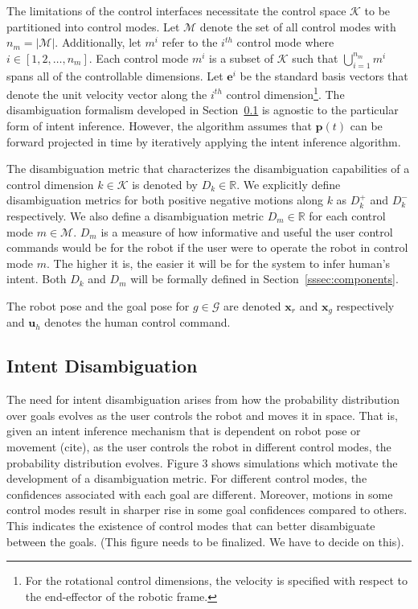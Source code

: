The limitations of the control interfaces necessitate the control space $\mathcal{K}$ to be partitioned into control modes. Let $\mathcal{M}$ denote the set of all control modes with $n_m = \vert\mathcal{M}\vert$. Additionally, let $m^i$ refer to the $i^{th}$ control mode where $i \in [1,2,\dots,n_m]$. Each control mode $m^i$ is a subset of $\mathcal{K}$ such that $\bigcup\limits_{i=1}^{n_m} m^i$ spans all of the controllable dimensions. Let $\boldsymbol{e}^i$ be the standard basis vectors that denote the unit velocity vector along the $i^{th}$ control dimension\footnote{For the rotational control dimensions, the velocity is specified with respect to the end-effector of the robotic frame.}. The disambiguation formalism developed in Section~\ref{ssec:disamb} is agnostic to the particular form of intent inference. However, the algorithm assumes that $\boldsymbol{p}(t)$ can be forward projected in time by iteratively applying the intent inference algorithm. 

The disambiguation metric that characterizes the disambiguation capabilities of a control dimension $k \in \mathcal{K}$ is denoted by $D_k \in \mathbb{R}$. We explicitly define disambiguation metrics for both positive negative motions along $k$ as $D_k^{+}$ and $D_k^{-}$ respectively. We also define a disambiguation metric $D_m \in \mathbb{R}$ for each control mode $m \in \mathcal{M}$. $D_m$ is a measure of how informative and useful the user control commands would be for the robot if the user were to operate the robot in control mode $m$. The higher it is, the easier it will be for the system to infer human's intent. Both $D_k$ and $D_m$ will be formally defined in Section~\ref{sssec:components}.

The robot pose and the goal pose for $g \in \mathcal{G}$ are denoted $\boldsymbol{x}_r$ and $\boldsymbol{x}_g$ respectively and $\boldsymbol{u}_h$ denotes the human control command.
\subsection{Intent Disambiguation}\label{ssec:disamb} 
The need for intent disambiguation arises from how the probability distribution over goals evolves as the user controls the robot and moves it in space. That is, given an intent inference mechanism that is dependent on robot pose or movement (cite), as the user controls the robot in different control modes, the probability distribution evolves. Figure 3 shows simulations which motivate the development of a disambiguation metric. For different control modes, the confidences associated with each goal are different. Moreover, motions in some control modes result in sharper rise in some goal confidences compared to others. This indicates the existence of control modes that can better disambiguate between the goals. (This figure needs to be finalized. We have to decide on this). 

